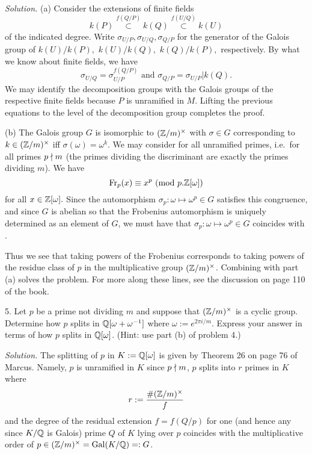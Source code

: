 \documentclass[10pt,a4paper,reqno]{amsart}
\begin{document}
\bigskip

\emph{Solution.} (a) Consider the extensions of finite fields \[ k(P)
\stackrel{f(Q/P)}{\subset} k(Q) \stackrel{f(U/Q)}{\subset} k(U) \] of the
indicated degree. Write $\sigma_{U/P}, \sigma_{U/Q}, \sigma_{Q/P}$ for the
generator of the Galois group of $k(U)/k(P),$ $k(U)/k(Q),$ $k(Q)/k(P),$
respectively. By what we know about finite fields, we have \[\sigma_{U/Q} =
\sigma_{U/P}^{f(Q/P)} \text{ and } \sigma_{Q/P} = \sigma_{U/P}|k(Q). \] We may
identify the decomposition groups with the Galois groups of the respective
finite fields because $P$ is unramified in $M$. Lifting the previous equations
to the level of the decomposition group completes the proof.

(b) The Galois group $G$ is isomorphic to $(\mathbb{Z}/m)^\times$ with $\sigma\in G$
corresponding to $k\in (\mathbb{Z}/m)^\times$ iff $\sigma(\omega) = \omega^k$. We may
consider  for all unramified primes, i.e.~for all primes $p\nmid m$ (the
primes dividing the discriminant are exactly the primes dividing $m$). We have
\[\mathrm{Fr}_{p}(x) \equiv x^p \text{ } (\mathrm{mod}\text{ }  p.\mathbb{Z}[\omega])\] for all $x\in \mathbb{Z}[\omega].$ Since
the automorphism $\sigma_p : \omega \mapsto \omega^p\in G$ satisfies this
congruence, and since $G$ is abelian so that the Frobenius automorphism is
uniquely determined as an element of $G$, we must have that $\sigma_p :
\omega\mapsto\omega^p \in G$ coincides with .

Thus we see that taking powers of the Frobenius corresponds to taking powers of
the residue class of $p$ in the multiplicative group $(\mathbb{Z}/m)^\times$. Combining
with part (a) solves the problem. For more along these lines, see the
discussion on page 110 of the book.

\bigskip

5. Let $p$ be a prime not dividing $m$ and suppose that $(\mathbb{Z}/m)^\times$ is a
cyclic group. Determine how $p$ splits in $\mathbb{Q}[\omega+\omega^{-1}]$ where
$\omega := e^{2\pi i/m}$. Express your answer in terms of how $p$ splits in
$\mathbb{Q}[\omega]$. (Hint: use part (b) of problem 4.)

\bigskip

\emph{Solution.} The splitting of $p$ in $K:= \mathbb{Q}[\omega]$ is given by Theorem
26 on page 76 of Marcus. Namely, $p$ is unramified in $K$ since $p\nmid m$, $p$
splits into $r$ primes in $K$ where \[r := \frac{\# (\mathbb{Z}/m)^\times}{f}\] and the
degree of the residual extension $f = f(Q/p)$ for one (and hence any since
$K/\mathbb{Q}$ is Galois) prime $Q$ of $K$ lying over $p$ coincides with the
multiplicative order of $p \in (\mathbb{Z}/m)^\times = \mathrm{Gal}(K/\mathbb{Q}) =: G$.
\end{document}
